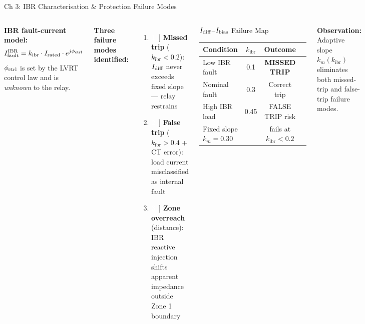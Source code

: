 \documentclass[10pt,aspectratio=169]{beamer}
\newcommand{\bitem}[1]{%
  \makebox[16pt]{\textcolor{white}{\colorbox{iitmblue}{\bfseries\scriptsize#1}}}\,%
}
\newcommand{\obs}[1]{%
  {\color{iitmred}\textbf{Observation:} #1}%
}
\newcommand{\kibr}{k_{\mathrm{ibr}}}
\begin{document}
\begin{frame}{Ch 3: IBR Characterisation \& Protection Failure Modes}
  \begin{columns}[T]
      \textbf{IBR fault-current model:}
      \[
        I_{\rm fault}^{\rm IBR} =
          \kibr \cdot I_{\rm rated} \cdot e^{j\phi_{\rm ctrl}}
      \]
      \small $\phi_{\rm ctrl}$ is set by the LVRT control law and
      is \textit{unknown} to the relay.
      \medskip

      \textbf{Three failure modes identified:}
      \begin{enumerate}\itemsep4pt
        \item[\bitem{1}] \textbf{Missed trip} ($\kibr < 0.2$):
          $I_{\rm diff}$ never exceeds fixed slope — relay restrains
        \item[\bitem{2}] \textbf{False trip} ($\kibr > 0.4$ + CT error):
          load current misclassified as internal fault
        \item[\bitem{3}] \textbf{Zone overreach} (distance):
          IBR reactive injection shifts apparent impedance
          outside Zone 1 boundary
      \end{enumerate}
      \begin{block}{\small $I_{\rm diff}$--$I_{\rm bias}$ Failure Map}
        \small
        \begin{tabular}{lccc}
          \toprule
          Condition & $\kibr$ & Outcome\\
          \midrule
          Low IBR fault & 0.1 & {\color{iitmred}\textbf{MISSED TRIP}}\\
          Nominal fault & 0.3 & {\color{green!60!black}Correct trip}\\
          High IBR load & 0.45 & {\color{iitmred}FALSE TRIP risk}\\
          \midrule
          \multicolumn{2}{l}{Fixed slope $k_m = 0.30$} & fails at $\kibr < 0.2$\\
          \bottomrule
        \end{tabular}
      \end{block}
      \obs{Adaptive slope $k_m(\kibr)$ eliminates
        both missed-trip and false-trip failure modes.}
  \end{columns}
\end{frame}
\end{document}
